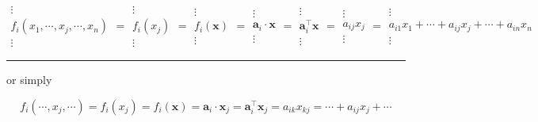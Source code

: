 \documentclass[
]{book}
\theoremstyle{definition}
\theoremstyle{definition}
\theoremstyle{definition}
\theoremstyle{definition}
\theoremstyle{remark}
\begin{document}
\[
\begin{array}{c}
\vdots\\
f_{{\scriptscriptstyle i}}\left(x_{{\scriptscriptstyle 1}},\cdots,x_{{\scriptscriptstyle j}},\cdots,x_{{\scriptscriptstyle n}}\right)\\
\vdots
\end{array}=\begin{array}{c}
\vdots\\
f_{{\scriptscriptstyle i}}\left(x_{{\scriptscriptstyle j}}\right)\\
\vdots
\end{array}=\begin{array}{c}
\vdots\\
f_{{\scriptscriptstyle i}}\left(\boldsymbol{x}\right)\\
\vdots
\end{array}=\begin{array}{c}
\vdots\\
\boldsymbol{a}_{{\scriptscriptstyle i}}\cdot\boldsymbol{x}\\
\vdots
\end{array}=\begin{array}{c}
\vdots\\
\boldsymbol{a}_{{\scriptscriptstyle i}}^{\intercal}\boldsymbol{x}\\
\vdots
\end{array}=\begin{array}{c}
\vdots\\
a_{{\scriptscriptstyle ij}}x_{{\scriptscriptstyle j}}\\
\vdots
\end{array}=\begin{array}{c}
\vdots\\
a_{{\scriptscriptstyle i1}}x_{{\scriptscriptstyle 1}}+\cdots+a_{{\scriptscriptstyle ij}}x_{{\scriptscriptstyle j}}+\cdots+a_{{\scriptscriptstyle in}}x_{{\scriptscriptstyle n}}\\
\vdots
\end{array}
\]

\begin{center}\rule{0.5\linewidth}{0.5pt}\end{center}

or simply

\[
f_{{\scriptscriptstyle i}}\left(\cdots,x_{{\scriptscriptstyle j}},\cdots\right)=f_{{\scriptscriptstyle i}}\left(x_{{\scriptscriptstyle j}}\right)=f_{{\scriptscriptstyle i}}\left(\boldsymbol{x}\right)=\boldsymbol{a}_{{\scriptscriptstyle i}}\cdot\boldsymbol{x}_{{\scriptscriptstyle j}}=\boldsymbol{a}_{{\scriptscriptstyle i}}^{\intercal}\boldsymbol{x}_{{\scriptscriptstyle j}}=a_{{\scriptscriptstyle ik}}x_{{\scriptscriptstyle kj}}=\cdots+a_{{\scriptscriptstyle ij}}x_{{\scriptscriptstyle j}}+\cdots
\]
\end{document}
